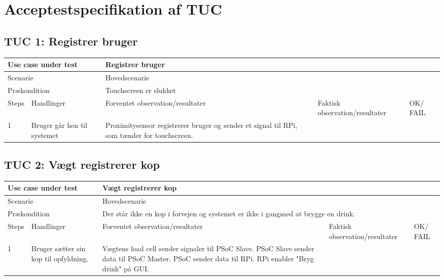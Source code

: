 \section{Acceptestspecifikation af TUC}

\subsection{TUC 1: Registrer bruger}

\begin{table}[H]
\begin{tabular}{|p{1cm}|p{4cm}|p{4cm}|p{4cm}|p{1cm}|}
\hline
\multicolumn{2}{|p{5cm}|}{Use case under test} & \multicolumn{3}{p{9cm}|}{Registrer bruger}                                       \\ \hline
\multicolumn{2}{|p{5cm}|}{Scenarie}            & \multicolumn{3}{p{9cm}|}{Hovedscenarie}                                          \\ \hline
\multicolumn{2}{|p{5cm}|}{Prækondition}        & \multicolumn{3}{p{9cm}|}{Touchscreen er slukket}                                 \\ \hline
Steps               & Handlinger          & Forventet observation/resultater & Faktisk observation/resultater & OK/ FAIL \\ \hline
1    & Bruger går hen til systemet  & Proximitysensor registrerer bruger og sender et signal til RPi, som tænder for touchscreen.  &   &         \\ \hline

\end{tabular}
\end{table}

\subsection{TUC 2: Vægt registrerer kop}

\begin{table}[H]
\begin{tabular}{|p{1cm}|p{4cm}|p{4cm}|p{4cm}|p{1cm}|}
\hline
\multicolumn{2}{|p{5cm}|}{Use case under test} & \multicolumn{3}{p{9cm}|}{Vægt registrerer kop}                                       \\ \hline
\multicolumn{2}{|p{5cm}|}{Scenarie}            & \multicolumn{3}{p{9cm}|}{Hovedscenarie}                                          \\ \hline
\multicolumn{2}{|p{5cm}|}{Prækondition}        & \multicolumn{3}{p{9cm}|}{Der står ikke en kop i forvejen og systemet er ikke i gangmed at brygge en drink.}                                 \\ \hline
Steps               & Handlinger          & Forventet observation/resultater & Faktisk observation/resultater & OK/ FAIL \\ \hline
1    & Bruger sætter sin kop til opfyldning.  &  Vægtens load cell sender signaler til PSoC Slave. PSoC Slave sender data til PSoC Master. PSoC sender data til RPi. RPi enabler "Bryg drink" på GUI. &   &         \\ \hline

\end{tabular}
\end{table}

